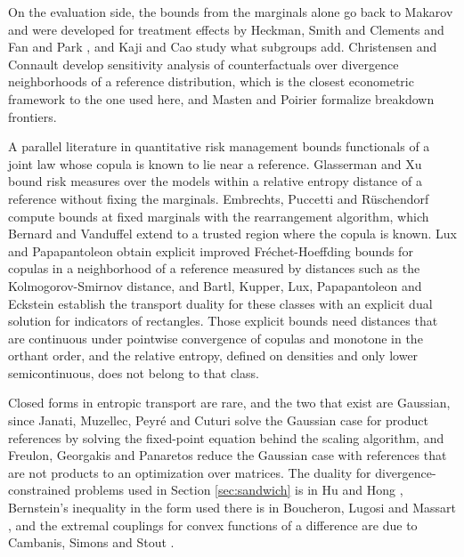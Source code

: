 \documentclass[11pt,a4paper]{article}
\theoremstyle{notesplain}
\theoremstyle{notesupright}
\numberwithin{equation}{section}
\begin{document}
On the evaluation side, the bounds from the marginals alone go back to Makarov \cite{makarov} and were developed for treatment effects by Heckman, Smith and Clements \cite{heckman} and Fan and Park \cite{fanpark}, and Kaji and Cao \cite{kajicao} study what subgroups add. Christensen and Connault \cite{christensenconnault} develop sensitivity analysis of counterfactuals over divergence neighborhoods of a reference distribution, which is the closest econometric framework to the one used here, and Masten and Poirier \cite{mastenpoirier} formalize breakdown frontiers.

A parallel literature in quantitative risk management bounds functionals of a joint law whose copula is known to lie near a reference. Glasserman and Xu \cite{glassermanxu} bound risk measures over the models within a relative entropy distance of a reference without fixing the marginals. Embrechts, Puccetti and Rüschendorf \cite{embrechts} compute bounds at fixed marginals with the rearrangement algorithm, which Bernard and Vanduffel \cite{bernardvanduffel} extend to a trusted region where the copula is known. Lux and Papapantoleon \cite{luxpapapantoleon} obtain explicit improved Fréchet-Hoeffding bounds for copulas in a neighborhood of a reference measured by distances such as the Kolmogorov-Smirnov distance, and Bartl, Kupper, Lux, Papapantoleon and Eckstein \cite{bartl} establish the transport duality for these classes with an explicit dual solution for indicators of rectangles. Those explicit bounds need distances that are continuous under pointwise convergence of copulas and monotone in the orthant order, and the relative entropy, defined on densities and only lower semicontinuous, does not belong to that class.

Closed forms in entropic transport are rare, and the two that exist are Gaussian, since Janati, Muzellec, Peyré and Cuturi \cite{janati} solve the Gaussian case for product references by solving the fixed-point equation behind the scaling algorithm, and Freulon, Georgakis and Panaretos \cite{freulon} reduce the Gaussian case with references that are not products to an optimization over matrices. The duality for divergence-constrained problems used in Section \ref{sec:sandwich} is in Hu and Hong \cite{huhong}, Bernstein's inequality in the form used there is in Boucheron, Lugosi and Massart \cite{blm}, and the extremal couplings for convex functions of a difference are due to Cambanis, Simons and Stout \cite{cambanis}.
\end{document}
